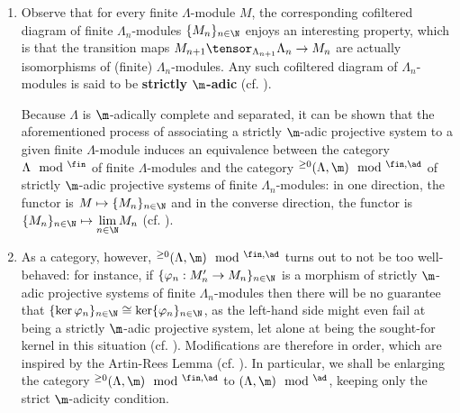         \begin{remark} \label{remark: strictly_adic_projective_systems}
            \noindent
            \begin{enumerate}
                \item Observe that for every finite $\Lambda$-module $M$, the corresponding cofiltered diagram of finite $\Lambda_n$-modules $\{M_n\}_{n \in \N}$ enjoys an interesting property, which is that the transition maps $M_{n + 1} \tensor_{\Lambda_{n + 1}} \Lambda_n \to M_n$ are actually isomorphisms of (finite) $\Lambda_n$-modules. Any such cofiltered diagram of $\Lambda_n$-modules is said to be \textbf{strictly $\m$-adic} (cf. \cite[Definition 1.4.1.1]{conrad_etale_cohomology}). 
            
                Because $\Lambda$ is $\m$-adically complete and separated, it can be shown that the aforementioned process of associating a strictly $\m$-adic projective system to a given finite $\Lambda$-module induces an equivalence between the category $\Lambda\mod^{\fin}$ of finite $\Lambda$-modules and the category ${}^{\geq 0}(\Lambda, \m)\mod^{\fin, \ad}$ of strictly $\m$-adic projective systems of finite $\Lambda_n$-modules: in one direction, the functor is $M \mapsto \{M_n\}_{n \in \N}$ and in the converse direction, the functor is $\{M_n\}_{n \in \N} \mapsto \underset{n \in \N}{\lim} M_n$ (cf. \cite[\href{https://stacks.math.columbia.edu/tag/031D}{Tag 031D}]{stacks}).
                \item As a category, however, ${}^{\geq 0}(\Lambda, \m)\mod^{\fin, \ad}$ turns out to not be too well-behaved: for instance, if $\{\varphi_n: M'_n \to M_n\}_{n \in \N}$ is a morphism of strictly $\m$-adic projective systems of finite $\Lambda_n$-modules then there will be no guarantee that $\{\ker \varphi_n\}_{n \in \N} \cong \ker \{\varphi_n\}_{n \in \N}$, as the left-hand side might even fail at being a strictly $\m$-adic projective system, let alone at being the sought-for kernel in this situation (cf. \cite[Example 1.4.1.3]{conrad_etale_cohomology}). Modifications are therefore in order, which are inspired by the Artin-Rees Lemma (cf. \cite[Example 1.4.1.4]{conrad_etale_cohomology}). In particular, we shall be enlarging the category ${}^{\geq 0}(\Lambda, \m)\mod^{\fin, \ad}$ to $(\Lambda, \m)\mod^{\ad}$, keeping only the strict $\m$-adicity condition. 
            \end{enumerate}
        \end{remark}
        
